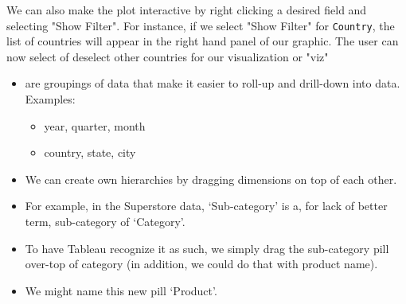 \documentclass[xcolor=svgnames]{beamer} %
\begin{document}
\begin{frame}
We can also make the plot interactive by right clicking a desired field and selecting  "Show Filter".
\vfill
For instance, if we select "Show Filter" for  {\tt Country}, the list of countries will appear in the right hand panel of our graphic.
\vfill 
The user can now select of deselect other countries for our visualization or "viz"
\end{frame}


\begin{frame}
\begin{itemize}
\item {} are groupings of data that make it easier to roll-up and drill-down into data.
Examples: 
\begin{itemize}
\item year, quarter, month
\item country, state, city
\end{itemize}
\vfill
\item We can create own hierarchies by dragging dimensions on top of each other. \vfill
\item For example, in the Superstore data, `Sub-category' is a, for lack of better term, sub-category of `Category'.\vfill
\item To have Tableau recognize it as such, we simply drag the sub-category pill over-top of category (in addition, we could do that with product name).  \vfill
\item We might name this new pill `Product'.\vfill
\end{itemize}
\end{frame}
\end{document}
